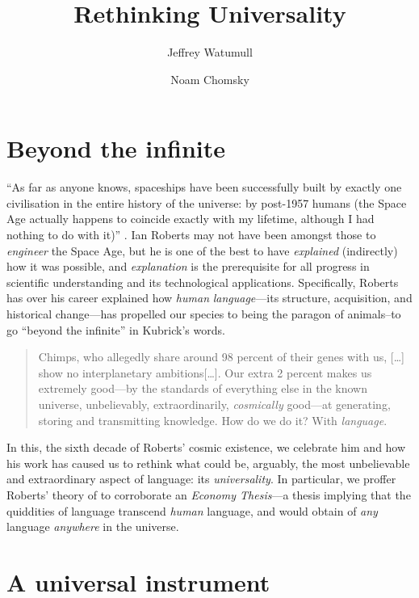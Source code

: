 \documentclass[output=paper]{langsci/langscibook}
\author{Jeffrey Watumull\affiliation{Oceanit}\and Noam
    Chomsky\affiliation{University of Arizona, Massachusetts Institute of
Technology}}
\title{Rethinking Universality}
\begin{document}
\glsresetall

\section{Beyond the infinite}%

“As far as anyone knows, spaceships have been successfully built by exactly one
civilisation in the entire history of the universe: by post-1957 humans (the
Space Age actually happens to coincide exactly with my lifetime, although I had
nothing to do with it)” \citep[1]{Roberts2017}. Ian Roberts may not have been
amongst those to \emph{engineer} the Space Age, but he is one of the best to
have \emph{explained} (indirectly) how it was possible, and \emph{explanation}
is the prerequisite for all progress in scientific understanding and its
technological applications. Specifically, Roberts has over his career explained
how \emph{human} \emph{language}—its structure, acquisition, and historical
change—has propelled our species to being the paragon of animals--to go
\enquote{beyond the infinite} in Kubrick's words. \blockquote{Chimps, who
    allegedly share around 98 percent of their genes with us, […] show no
    interplanetary ambitions[…]. Our extra 2 percent makes us extremely good—by
    the standards of everything else in the known universe, unbelievably,
    extraordinarily, \emph{cosmically} good—at generating, storing and
    transmitting knowledge. How do we do it? With \emph{language}.
\citep[1--2]{Roberts2017}} In this, the sixth decade of Roberts’ cosmic
existence, we celebrate him and how his work has caused us to rethink what
could be, arguably, the most unbelievable and extraordinary aspect of language:
its \emph{universality}. In particular, we proffer Roberts’ theory of
 to corroborate an \emph{Economy Thesis}—a thesis
    implying that the quiddities of language transcend \emph{human} language,
    and would obtain of \emph{any} language \emph{anywhere} in the universe.

\section{A universal instrument}
\end{document}
